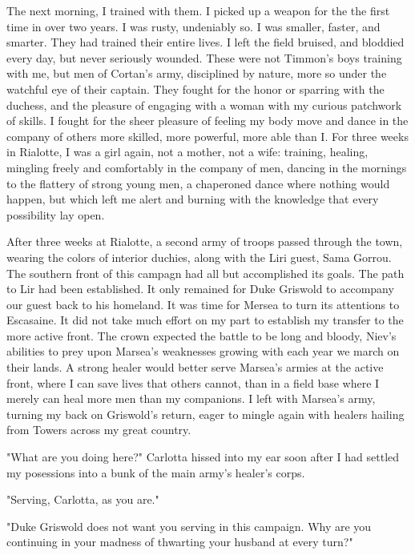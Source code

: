 \documentclass{article}
\begin{document}
The next morning, I trained with them. I picked up a weapon for the the first time in over two years. I was rusty, undeniably so. I was smaller, faster, and smarter. They had trained their entire lives. I left the field bruised, and bloddied every day, but never seriously wounded. These were not Timmon's boys training with me, but men of Cortan's army, disciplined by nature, more so under the watchful eye of their captain. They fought for the honor or sparring with the duchess, and the pleasure of engaging with a woman with my curious patchwork of skills. I fought for the sheer pleasure of feeling my body move and dance in the company of others more skilled, more powerful, more able than I. For three weeks in Rialotte, I was a girl again, not a mother, not a wife: training, healing, mingling freely and comfortably in the company of men, dancing in the mornings to the flattery of strong young men, a chaperoned dance where nothing would happen, but which left me alert and burning with the knowledge that every possibility lay open. 

After three weeks at Rialotte, a second army of troops passed through the town, wearing the colors of interior duchies, along with the Liri guest, Sama Gorrou. The southern front of this campagn had all but accomplished its goals. The path to Lir had been established. It only remained for Duke Griswold to accompany our guest back to his homeland. It was time for Mersea to turn its attentions to Escasaine. It did not take much effort on my part to establish my transfer to the more active front. The crown expected the battle to be long and bloody, Niev's abilities to prey upon Marsea's weaknesses growing with each year we march on their lands. A strong healer would better serve Marsea's armies at the active front, where I can save lives that others cannot, than in a field base where I merely can heal more men than my companions. I left with Marsea's army, turning my back on Griswold's return, eager to mingle again with healers hailing from Towers across my great country.

\vspace{.5cm}

"What are you doing here?" Carlotta hissed into my ear soon after I had settled my posessions into a bunk of the main army's healer's corps.

"Serving, Carlotta, as you are."

"Duke Griswold does not want you serving in this campaign. Why are you continuing in your madness of thwarting your husband at every turn?"
\end{document}
